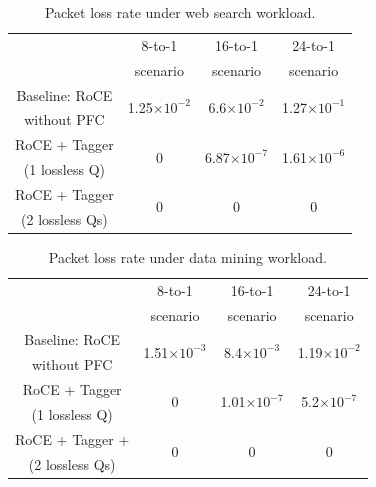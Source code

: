 \begin{table}[t]
	\footnotesize
	\centering
	\begin{tabular}{|c|c|c|c|}
		\hline
		& 8-to-1 & 16-to-1 & 24-to-1 \\
		&scenario & scenario & scenario \\
		\hline
		\hline
		
		Baseline: RoCE  & \multirow{2}{*}{1.25$\times 10^{-2}$} & \multirow{2}{*}{6.6$\times 10^{-2}$}  & \multirow{2}{*}{1.27$\times 10^{-1}$} \\
		without PFC &  &  & \\
		\hline
		
		RoCE + Tagger & \multirow{2}{*}{0} & \multirow{2}{*}{6.87$\times 10^{-7}$}  & \multirow{2}{*}{1.61$\times 10^{-6}$} \\
		(1 lossless Q) &  &  & \\
		\hline
		
		RoCE + Tagger & \multirow{2}{*}{0} & \multirow{2}{*}{0}  & \multirow{2}{*}{0} \\	
		(2 lossless Qs) &  &  & \\
		\hline
	\end{tabular}
	\vspace{-0.5em}
	\caption{Packet loss rate under web search workload.}
	\vspace{-0.5em}
	\label{table:loss_rate_ws} 
\end{table}


\begin{table}[t]
	\footnotesize
	\centering
	\begin{tabular}{|c|c|c|c|}
		
		\hline
		& 8-to-1 & 16-to-1 & 24-to-1 \\
		&scenario & scenario & scenario \\
		\hline
		
		Baseline: RoCE  & \multirow{2}{*}{1.51$\times 10^{-3}$} & \multirow{2}{*}{8.4$\times 10^{-3}$}  & \multirow{2}{*}{1.19$\times 10^{-2}$} \\
		without PFC &  &  & \\
		\hline
				
		\hline
		RoCE + Tagger & \multirow{2}{*}{0} & \multirow{2}{*}{1.01$\times 10^{-7}$}  & \multirow{2}{*}{5.2$\times 10^{-7}$} \\
		(1 lossless Q) &  &  & \\
		\hline
		
		RoCE + Tagger + & \multirow{2}{*}{0} & \multirow{2}{*}{0}  & \multirow{2}{*}{0} \\
		(2 lossless Qs) &  &  & \\
		\hline
	\end{tabular}
	\vspace{-0.5em}
	\caption{Packet loss rate under data mining workload.}
	\vspace{-0.5em}
	\label{table:loss_rate_dm} 
\end{table}





